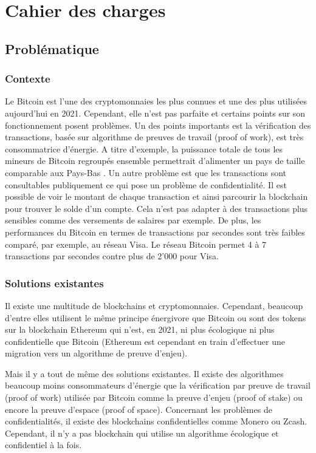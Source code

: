 \chapter{Cahier des charges}

\section*{Problématique}

\subsection*{Contexte}

Le Bitcoin est l'une des cryptomonnaies les plus connues et une des plus utilisées aujourd'hui en 2021. Cependant, elle n'est pas parfaite et certains points sur son fonctionnement posent problèmes. Un des points importants est la vérification des transactions, basée sur algorithme de preuves de travail (proof of work), est très consommatrice d'énergie. A titre d'exemple, la puissance totale de tous les mineurs de Bitcoin regroupés ensemble permettrait d'alimenter un pays de taille comparable aux Pays-Bas \cite{BTC_cons}. Un autre problème est que les transactions sont consultables publiquement ce qui pose un problème de confidentialité. Il est possible de voir le montant de chaque transaction et ainsi parcourir la blockchain pour trouver le solde d'un compte. Cela n'est pas adapter à des transactions plus sensibles comme des versements de salaires par exemple. De plus, les performances du Bitcoin en termes de transactions par secondes sont très faibles comparé, par exemple, au réseau Visa. Le réseau Bitcoin permet 4 à 7 transactions par secondes contre plus de 2'000 pour Visa.

\subsection*{Solutions existantes}

Il existe une multitude de blockchains et cryptomonnaies. Cependant, beaucoup d'entre elles utilisent le même principe énergivore que Bitcoin ou sont des tokens sur la blockchain Ethereum qui n'est, en 2021, ni plus écologique ni plus confidentielle que Bitcoin (Ethereum est cependant en train d'effectuer une migration vers un algorithme de preuve d'enjeu).

Mais il y a tout de même des solutions existantes. Il existe des algorithmes beaucoup moins consommateurs d'énergie que la vérification par preuve de travail (proof of work) utilisée par Bitcoin comme la preuve d'enjeu (proof of stake) ou encore la preuve d'espace (proof of space). Concernant les problèmes de confidentialités, il existe des blockchains confidentielles comme Monero ou Zcash. Cependant, il n'y a pas blockchain qui utilise un algorithme écologique et confidentiel à la fois.

